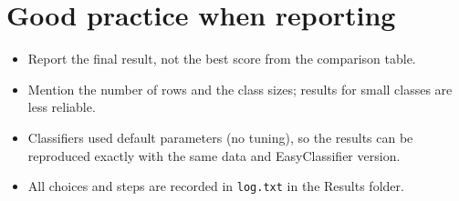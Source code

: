 \documentclass[11pt,a4paper]{article}
\begin{document}
\section{Good practice when reporting}
\begin{itemize}
\item Report the final result, not the best score from the comparison table.
\item Mention the number of rows and the class sizes; results for small classes are less reliable.
\item Classifiers used default parameters (no tuning), so the results can be reproduced exactly with the same data and EasyClassifier version.
\item All choices and steps are recorded in \texttt{log.txt} in the Results folder.
\end{itemize}
\end{document}
